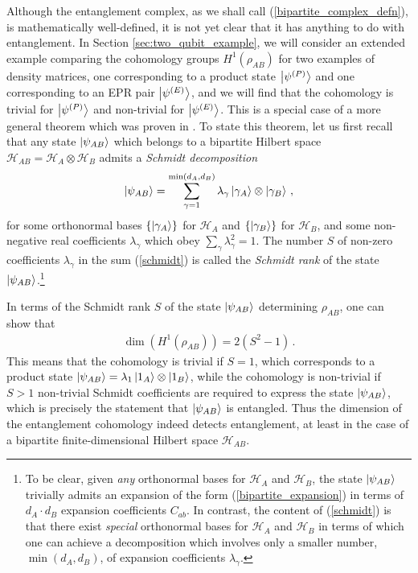 \documentclass[12pt]{article}
\numberwithin{equation}{section}
\begin{document}
Although the entanglement complex, as we shall call (\ref{bipartite_complex_defn}), is mathematically well-defined, it is not yet clear that it has anything to do with entanglement. In Section \ref{sec:two_qubit_example}, we will consider an extended example comparing the cohomology groups $H^1 ( \rho_{AB} )$ for two examples of density matrices, one corresponding to a product state $\ket{\psi^{(P)}}$ and one corresponding to an EPR pair $\ket{\psi^{(E)}}$, and we will find that the cohomology is trivial for $\ket{\psi^{(P)}}$ and non-trivial for $\ket{\psi^{(E)}}$. This is a special case of a more general theorem which was proven in \cite{Mainiero:2019enr}. To state this theorem, let us first recall that any state $\ket{\psi_{AB}}$ which belongs to a bipartite Hilbert space $\mathcal{H}_{AB} = \mathcal{H}_A \otimes \mathcal{H}_B$ admits a \emph{Schmidt decomposition}
%
\begin{align}\label{schmidt}
    \ket{\psi_{AB}} = \sum_{\gamma=1}^{\min ( d_A, d_B )} \lambda_\gamma \ket{ \gamma_A } \otimes \ket{\gamma_B} \, ,
\end{align}
%
for some orthonormal bases $\left\{ \ket{\gamma_A} \right\}$ for $\mathcal{H}_A$ and $\left\{ \ket{\gamma_B} \right\}$ for $\mathcal{H}_B$, and some non-negative real coefficients $\lambda_\gamma$ which obey $\sum_\gamma \lambda_\gamma^2 = 1$. The number $S$ of non-zero coefficients $\lambda_\gamma$ in the sum (\ref{schmidt}) is called the \emph{Schmidt rank} of the state $\ket{\psi_{AB}}$.\footnote{To be clear, given \emph{any} orthonormal bases for $\mathcal{H}_A$ and $\mathcal{H}_B$, the state $\ket{\psi_{AB}}$ trivially admits an expansion of the form (\ref{bipartite_expansion}) in terms of $d_A \cdot d_B$ expansion coefficients $C_{ab}$. In contrast, the content of (\ref{schmidt}) is that there exist \emph{special} orthonormal bases for $\mathcal{H}_A$ and $\mathcal{H}_B$ in terms of which one can achieve a decomposition which involves only a smaller number, $\min ( d_A, d_B )$, of expansion coefficients $\lambda_\gamma$.}

In terms of the Schmidt rank $S$ of the state $\ket{\psi_{AB}}$ determining $\rho_{AB}$, one can show that
%
\begin{align}
    \dim \left( H^1 \left( \rho_{AB} \right) \right) = 2 \left( S^2 - 1 \right) \, .
\end{align}
%
This means that the cohomology is trivial if $S = 1$, which corresponds to a product state $\ket{\psi_{AB}} = \lambda_1 \ket{1_A} \otimes \ket{1_B}$, while the cohomology is non-trivial if $S > 1$ non-trivial Schmidt coefficients are required to express the state $\ket{\psi_{AB}}$, which is precisely the statement that $\ket{\psi_{AB}}$ is entangled. Thus the dimension of the entanglement cohomology indeed detects entanglement, at least in the case of a bipartite finite-dimensional Hilbert space $\mathcal{H}_{AB}$.
\end{document}
